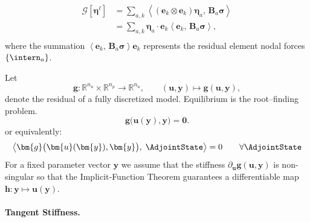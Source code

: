 \begin{equation}
\begin{aligned}
\mathcal{G}\left[\bm{\eta}^\ell\right]
&= \sum_{a,k} \left<\left(\mathbf{e}_k\otimes\mathbf{e}_k\right) \bm{\eta}_a,\, \bm{B}_a  \bm{\sigma} \right> \\
&= \sum_{a,k} \bm{\eta}_a \cdot \mathbf{e}_k  \left<\mathbf{e}_k ,\, \bm{B}_a  \bm{\sigma} \right>, \\
\end{aligned}
\label{eq:global-work-dot}
\end{equation}
where the summation \(\left<\mathbf{e}_k ,\,\bm{B}_a  \bm{\sigma} \right> \mathbf{e}_k\) 
represents the residual element nodal forces \(\{\intern_a\}\).

Let
%
\[
  \bm{g}:\mathbb{R}^{n_u}\!\times\!\mathbb{R}^{n_p}\longrightarrow\mathbb{R}^{n_u},
  \qquad
  (\bm{u},\bm{y})\mapsto\bm{g}(\bm{u},\bm{y}),
\]
%
denote the residual of a fully discretized model.
Equilibrium is the root–finding problem.
%
\begin{equation}\label{eq:equil}
  \bm{g}\bigl(\bm{u}(\bm{y}),\bm{y}\bigr)=\bm{0}.
\end{equation}
or equivalently:
\begin{equation*}
 \left< \bm{g}\bigl(\bm{u}(\bm{y}),\bm{y}\bigr),\; \AdjointState \right>= 0
 \qquad\forall \AdjointState
\end{equation*}
For a fixed parameter vector $\bm{y}$ we assume that the stiffness 
$\partial_{\bm{u}}\bm{g}(\bm{u},\bm{y})$ is non-singular so that the Implicit‐Function
Theorem guarantees a differentiable map
$\bm{h}:\bm{y}\mapsto\bm{u}(\bm{y})$.

\paragraph{Tangent Stiffness.}

